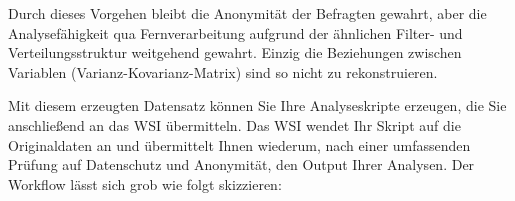 Durch dieses Vorgehen bleibt die Anonymität der Befragten gewahrt, aber die Analysefähigkeit qua Fernverarbeitung aufgrund der ähnlichen Filter- und Verteilungsstruktur weitgehend gewahrt. Einzig die Beziehungen zwischen Variablen (Varianz-Kovarianz-Matrix) sind so nicht zu rekonstruieren. 

Mit diesem erzeugten Datensatz können Sie Ihre Analyseskripte erzeugen, die Sie anschließend an das WSI übermitteln. Das WSI wendet Ihr Skript auf die Originaldaten an und übermittelt Ihnen wiederum, nach einer umfassenden Prüfung auf Datenschutz und Anonymität, den Output Ihrer Analysen. Der Workflow lässt sich grob wie folgt skizzieren:

\vspace*{0.5cm}



